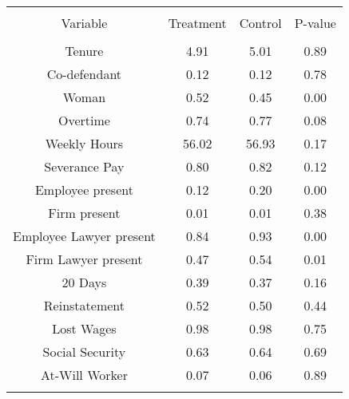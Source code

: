 
\begin{table}[!htbp] \centering 
  \caption{} 
  \label{} 
\begin{tabular}{@{\extracolsep{5pt}} cccc} 
\\[-1.8ex]\hline 
\hline \\[-1.8ex] 
Variable & Treatment & Control & P-value \\ 
\hline \\[-1.8ex] 
Tenure &  4.91 &  5.01 & 0.89 \\ 
Co-defendant &  0.12 &  0.12 & 0.78 \\ 
Woman &  0.52 &  0.45 & 0.00 \\ 
Overtime &  0.74 &  0.77 & 0.08 \\ 
Weekly Hours & 56.02 & 56.93 & 0.17 \\ 
Severance Pay &  0.80 &  0.82 & 0.12 \\ 
Employee present &  0.12 &  0.20 & 0.00 \\ 
Firm present &  0.01 &  0.01 & 0.38 \\ 
Employee Lawyer present &  0.84 &  0.93 & 0.00 \\ 
Firm Lawyer present &  0.47 &  0.54 & 0.01 \\ 
20 Days &  0.39 &  0.37 & 0.16 \\ 
Reinstatement &  0.52 &  0.50 & 0.44 \\ 
Lost Wages &  0.98 &  0.98 & 0.75 \\ 
Social Security &  0.63 &  0.64 & 0.69 \\ 
At-Will Worker &  0.07 &  0.06 & 0.89 \\ 
\hline \\[-1.8ex] 
\end{tabular} 
\end{table} 
